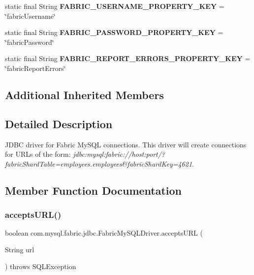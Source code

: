 \begin{DoxyCompactItemize}
static final String {\bfseries F\+A\+B\+R\+I\+C\+\_\+\+U\+S\+E\+R\+N\+A\+M\+E\+\_\+\+P\+R\+O\+P\+E\+R\+T\+Y\+\_\+\+K\+EY} = \char`\"{}fabric\+Username\char`\"{}
\item 
\mbox{\label{classcom_1_1mysql_1_1fabric_1_1jdbc_1_1_fabric_my_s_q_l_driver_afe7e65bf515666cece1337db061027a5}} 
static final String {\bfseries F\+A\+B\+R\+I\+C\+\_\+\+P\+A\+S\+S\+W\+O\+R\+D\+\_\+\+P\+R\+O\+P\+E\+R\+T\+Y\+\_\+\+K\+EY} = \char`\"{}fabric\+Password\char`\"{}
\item 
\mbox{\label{classcom_1_1mysql_1_1fabric_1_1jdbc_1_1_fabric_my_s_q_l_driver_a70d92db28da13ac352defe17dbc41cf0}} 
static final String {\bfseries F\+A\+B\+R\+I\+C\+\_\+\+R\+E\+P\+O\+R\+T\+\_\+\+E\+R\+R\+O\+R\+S\+\_\+\+P\+R\+O\+P\+E\+R\+T\+Y\+\_\+\+K\+EY} = \char`\"{}fabric\+Report\+Errors\char`\"{}
\end{DoxyCompactItemize}
\subsection*{Additional Inherited Members}


\subsection{Detailed Description}
J\+D\+BC driver for Fabric My\+S\+QL connections. This driver will create connections for U\+R\+Ls of the form\+: {\itshape jdbc\+:mysql\+:fabric\+://host\+:port/?fabric\+Shard\+Table=employees.\+employees\&fabric\+Shard\+Key=4621}. 

\subsection{Member Function Documentation}
\mbox{\label{classcom_1_1mysql_1_1fabric_1_1jdbc_1_1_fabric_my_s_q_l_driver_aff98c80cb762b27f7548fb5d35a2c1f0}} 
\subsubsection{\texorpdfstring{accepts\+U\+R\+L()}{acceptsURL()}}
{\footnotesize\ttfamily boolean com.\+mysql.\+fabric.\+jdbc.\+Fabric\+My\+S\+Q\+L\+Driver.\+accepts\+U\+RL (\begin{DoxyParamCaption}\item[{String}]{url }\end{DoxyParamCaption}) throws S\+Q\+L\+Exception}

